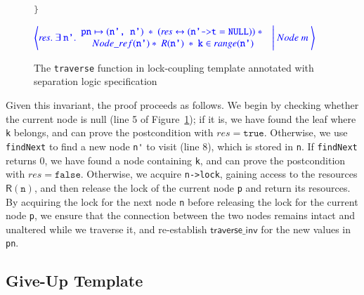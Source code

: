 \documentclass[a4paper,UKenglish,cleveref, autoref, thm-restate]{lipics-v2021}
\newcommand{\treerep}{\ensuremath{\mathsf{Node}}}
\newcommand{\nodeboxrep}{\ensuremath{\mathsf{Node\_ref}}}
\newcommand{\wm}[1]{\textbf{\textcolor{violet}{[William: #1]}}}
\begin{document}
\begin{figure}[h]
\begin{lstlisting}[language = C, style=myStyle, mathescape=true]
}  \end{lstlisting}
	$\color{blue}
	\left\langle \mathit{res}. \ \exists \  \texttt{n'}.
	\begin{array}{c} \texttt{pn} \mapsto (\texttt{n', n'}) \ \ast 
		\ (\mathit{res} \leftrightarrow (\texttt{n'->t} = \texttt{NULL}))  \ \ast \ \\ \nodeboxrep(\texttt{n'}) \ast \ \mathsf{R}(\texttt{n'})\ \ast \ \texttt{k} \in \mathsf{range}(\texttt{n'})
	\end{array}
	\ \Bigg| \ \treerep\ m \
	\right\rangle$
	\caption{The \texttt{traverse} function in lock-coupling template annotated with separation logic specification}
	\label{proof_lock_traverse}
\end{figure}

Given this invariant, the proof proceeds as follows. %
We begin by checking whether the current node is null (line 5 of Figure~\ref{proof_lock_traverse}); if it is, we have found the leaf where \lstinline{k} belongs, and can prove the postcondition with $\mathit{res} = \texttt{true}$. Otherwise, we use \lstinline{findNext} to find a new node \lstinline{n'} to visit (line 8), which is stored in \lstinline{n}. If \lstinline{findNext} returns 0, we have found a node containing \lstinline{k}, and can prove the postcondition with $\mathit{res} = \mathtt{false}$. Otherwise, we acquire \lstinline{n->lock}, gaining access to the resources $\mathsf{R}(\texttt{n})$, and then release the lock of the current node \texttt{p} and return its resources. %
By acquiring the lock for the next node \texttt{n} before releasing the lock for the current node \texttt{p}, we ensure that the connection between the two nodes remains intact and unaltered while we traverse it, and re-establish $\mathsf{traverse\_inv}$ for the new values in \lstinline{pn}. 


\subsection{Give-Up Template}
\label{give-up-algo}
\end{document}
